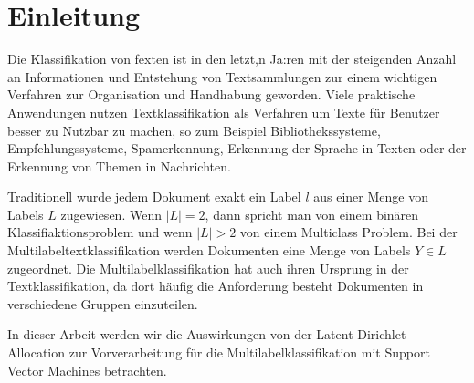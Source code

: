 \section{Einleitung}

Die Klassifikation von fexten ist in den letzt,n Ja:ren mit der steigenden Anzahl an Informationen und Entstehung von Textsammlungen zur einem wichtigen Verfahren zur Organisation und Handhabung geworden. Viele praktische Anwendungen nutzen Textklassifikation als Verfahren um Texte für Benutzer besser zu Nutzbar zu machen, so zum Beispiel Bibliothekssysteme, Empfehlungssysteme, Spamerkennung, Erkennung der Sprache in Texten oder der Erkennung von Themen in Nachrichten.

Traditionell wurde jedem Dokument exakt ein Label $l$ aus einer Menge von Labels $L$ zugewiesen. Wenn $|L| = 2$, dann spricht man von einem binären Klassifiaktionsproblem und wenn $|L| > 2$ von einem Multiclass Problem. Bei der Multilabeltextklassifikation werden Dokumenten eine Menge von Labels $Y \in L$ zugeordnet. Die Multilabelklassifikation hat auch ihren Ursprung in der Textklassifikation, da dort häufig die Anforderung besteht Dokumenten in verschiedene Gruppen einzuteilen.

In dieser Arbeit werden wir die Auswirkungen von der Latent Dirichlet Allocation zur Vorverarbeitung für die Multilabelklassifikation mit Support Vector Machines betrachten.

